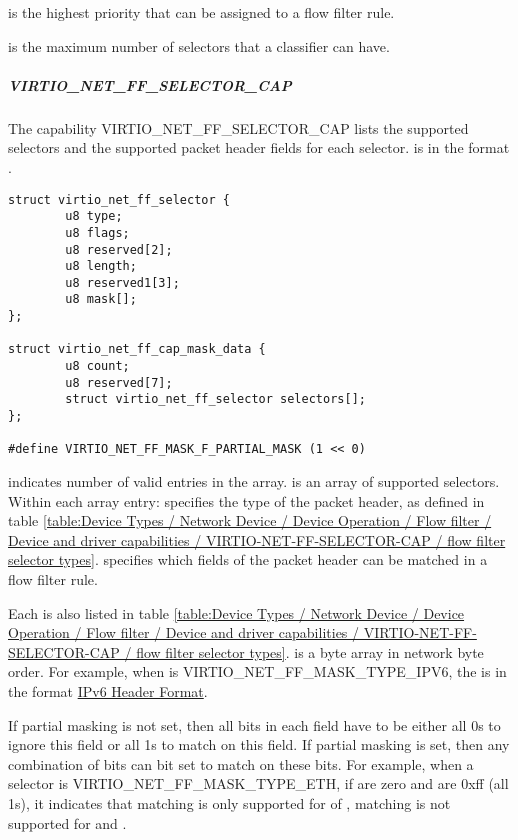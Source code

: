  is the highest priority that can be assigned to a
flow filter rule.

 is the maximum number of selectors
that a classifier can have.

\subparagraph{VIRTIO_NET_FF_SELECTOR_CAP}
\label{par:Device Types / Network Device / Device Operation / Flow filter / Device and driver capabilities / VIRTIO-NET-FF-SELECTOR-CAP}

The capability VIRTIO_NET_FF_SELECTOR_CAP lists the supported selectors and the
supported packet header fields for each selector.
 is in the format .

\begin{lstlisting}[label={lst:Device Types / Network Device / Device Operation / Flow filter / Device and driver capabilities / VIRTIO-NET-FF-SELECTOR-CAP / virtio-net-ff-selector}]
struct virtio_net_ff_selector {
        u8 type;
        u8 flags;
        u8 reserved[2];
        u8 length;
        u8 reserved1[3];
        u8 mask[];
};

struct virtio_net_ff_cap_mask_data {
        u8 count;
        u8 reserved[7];
        struct virtio_net_ff_selector selectors[];
};

#define VIRTIO_NET_FF_MASK_F_PARTIAL_MASK (1 << 0)
\end{lstlisting}

 indicates number of valid entries in the  array.
 is an array of supported selectors. Within each array entry:
 specifies the type of the packet header, as defined in table
\ref{table:Device Types / Network Device / Device Operation / Flow filter / Device and driver capabilities / VIRTIO-NET-FF-SELECTOR-CAP / flow filter selector types}.  specifies which fields of the
packet header can be matched in a flow filter rule.

Each  is also listed in table
\ref{table:Device Types / Network Device / Device Operation / Flow filter / Device and driver capabilities / VIRTIO-NET-FF-SELECTOR-CAP / flow filter selector types}.  is a byte array
in network byte order. For example, when  is VIRTIO_NET_FF_MASK_TYPE_IPV6,
the  is in the format \hyperref[intro:IPv6-Header-Format]{IPv6 Header Format}.

If partial masking is not set, then all bits in each field have to be either all 0s
to ignore this field or all 1s to match on this field. If partial masking is set,
then any combination of bits can bit set to match on these bits.
For example, when a selector  is VIRTIO_NET_FF_MASK_TYPE_ETH, if
 are zero and  are 0xff (all 1s), it
indicates that matching is only supported for  of
, matching is not supported for
 and .

